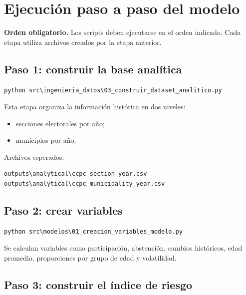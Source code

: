 \documentclass[11pt,a4paper]{article}
\begin{document}
\section{Ejecución paso a paso del modelo}

\begin{importante}
\textbf{Orden obligatorio.} Los scripts deben ejecutarse en el orden indicado. Cada etapa utiliza archivos creados por la etapa anterior.
\end{importante}

\subsection{Paso 1: construir la base analítica}

\begin{lstlisting}[style=terminal]
python src\ingenieria_datos\03_construir_dataset_analitico.py
\end{lstlisting}

Esta etapa organiza la información histórica en dos niveles:

\begin{itemize}
    \item secciones electorales por año;
    \item municipios por año.
\end{itemize}

Archivos esperados:

\begin{lstlisting}[style=terminal]
outputs\analytical\ccpc_section_year.csv
outputs\analytical\ccpc_municipality_year.csv
\end{lstlisting}

\subsection{Paso 2: crear variables}

\begin{lstlisting}[style=terminal]
python src\modelos\01_creacion_variables_modelo.py
\end{lstlisting}

Se calculan variables como participación, abstención, cambios históricos, edad promedio, proporciones por grupo de edad y volatilidad.

\subsection{Paso 3: construir el índice de riesgo}
\end{document}
